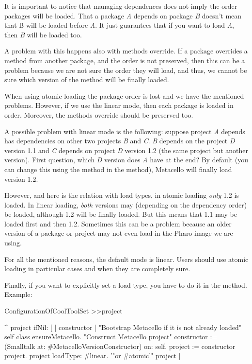 \documentclass[a4paper,10pt,twoside]{book}
\begin{document}
It is important to notice that managing dependences does not imply the order packages will be loaded. That a package \emph{A} depends on package \emph{B} doesn't mean that B will be loaded before \emph{A}. It just guarantees that if you want to load \emph{A}, then \emph{B} will be loaded too. 

A problem with this happens also with methods override. If a package overrides a method from another package, and the order is not preserved, then this can be a problem because we are not sure the order they will load, and thus, we cannot be sure which version of the method will be finally loaded. 

When using atomic loading the package order is lost and we have the mentioned problems. However, if we use the linear mode, then each package is loaded in order. Moreover, the methods override should be preserved too. 

A possible problem with linear mode is the following: suppose project \emph{A} depends has dependencies on other two projects \emph{B} and \emph{C}. \emph{B} depends on the project \emph{D} version 1.1 and \emph{C} depends on project \emph{D} version 1.2 (the same project but another version). First question, which \emph{D} version does \emph{A} have at the end?  By default (you can change this using the method  in the  method), Metacello will finally load version 1.2.

However, and here is the relation with load types, in atomic loading \emph{only} 1.2 is loaded. In linear loading, \emph{both} versions may (depending on the dependency order) be loaded, although 1.2 will be finally loaded. But this means that 1.1 may be loaded first and then 1.2. Sometimes this can be a problem because an older version of a package or project may not even load in the Pharo image we are using. 

For all the mentioned reasons, the default mode is linear. Users should use atomic loading in particular cases and when they are completely sure. 

Finally, if you want to explicitly set a load type, you have to do it in the  method. Example:

\begin{code}{}
ConfigurationOfCoolToolSet >>project

       ^ project ifNil: [ | constructor |
              "Bootstrap Metacello if it is not already loaded"
              self class ensureMetacello.
              "Construct Metacello project"
              constructor := (Smalltalk at: #MetacelloVersionConstructor) on: self.
              project := constructor project.
              project loadType: #linear. '"or #atomic'"
              project ]

\end{code}
\end{document}
